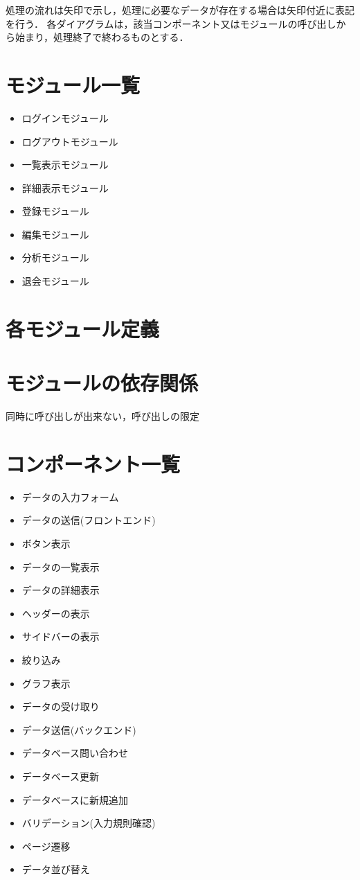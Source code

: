 \documentclass[a4paper, titlepage]{jsarticle}
\begin{document}
処理の流れは矢印で示し，処理に必要なデータが存在する場合は矢印付近に表記を行う．
各ダイアグラムは，該当コンポーネント又はモジュールの呼び出しから始まり，処理終了で終わるものとする．


\section{モジュール一覧}
\begin{itemize}
  \item ログインモジュール
  \item ログアウトモジュール
  \item 一覧表示モジュール
  \item 詳細表示モジュール
  \item 登録モジュール
  \item 編集モジュール
  \item 分析モジュール
  \item 退会モジュール
\end{itemize}
\section{各モジュール定義}
\section{モジュールの依存関係}
同時に呼び出しが出来ない，呼び出しの限定


\section{コンポーネント一覧}
\begin{itemize}
  \item データの入力フォーム
  \item データの送信(フロントエンド)
  \item ボタン表示
  \item データの一覧表示
  \item データの詳細表示
  \item ヘッダーの表示
  \item サイドバーの表示
  \item 絞り込み
  \item グラフ表示
  \item データの受け取り
  \item データ送信(バックエンド)
  \item データベース問い合わせ
  \item データベース更新
  \item データベースに新規追加
  \item バリデーション(入力規則確認)
  \item ページ遷移
  \item データ並び替え
\end{itemize}
\end{document}
